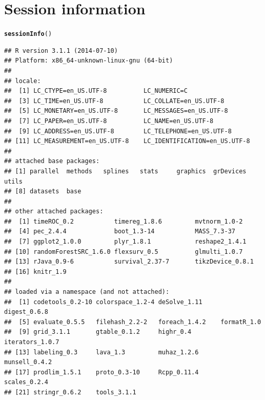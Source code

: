 \documentclass{article}\usepackage[]{graphicx}\usepackage[]{color}
\makeatletter
\newcommand{\hlstd}[1]{\textcolor[rgb]{0.345,0.345,0.345}{#1}}%
\newcommand{\hlkwd}[1]{\textcolor[rgb]{0.737,0.353,0.396}{\textbf{#1}}}%
\newenvironment{kframe}{%
 \def\at@end@of@kframe{}%
 \ifinner\ifhmode%
  \def\at@end@of@kframe{\end{minipage}}%
  \begin{minipage}{\columnwidth}%
 \fi\fi%
 \def\FrameCommand##1{\hskip\@totalleftmargin \hskip-\fboxsep
 \colorbox{shadecolor}{##1}\hskip-\fboxsep
     \hskip-\linewidth \hskip-\@totalleftmargin \hskip\columnwidth}%
 \MakeFramed {\advance\hsize-\width
   \@totalleftmargin\z@ \linewidth\hsize
   \@setminipage}}%
 {\par\unskip\endMakeFramed%
 \at@end@of@kframe}
\newenvironment{knitrout}{}{} %
\makeatother
\begin{document}
\section{Session information}
\begin{knitrout}
\color{fgcolor}\begin{kframe}
\begin{alltt}
\hlkwd{sessionInfo}\hlstd{()}
\end{alltt}
\begin{verbatim}
## R version 3.1.1 (2014-07-10)
## Platform: x86_64-unknown-linux-gnu (64-bit)
## 
## locale:
##  [1] LC_CTYPE=en_US.UTF-8          LC_NUMERIC=C                 
##  [3] LC_TIME=en_US.UTF-8           LC_COLLATE=en_US.UTF-8       
##  [5] LC_MONETARY=en_US.UTF-8       LC_MESSAGES=en_US.UTF-8      
##  [7] LC_PAPER=en_US.UTF-8          LC_NAME=en_US.UTF-8          
##  [9] LC_ADDRESS=en_US.UTF-8        LC_TELEPHONE=en_US.UTF-8     
## [11] LC_MEASUREMENT=en_US.UTF-8    LC_IDENTIFICATION=en_US.UTF-8
## 
## attached base packages:
## [1] parallel  methods   splines   stats     graphics  grDevices utils    
## [8] datasets  base     
## 
## other attached packages:
##  [1] timeROC_0.2           timereg_1.8.6         mvtnorm_1.0-2        
##  [4] pec_2.4.4             boot_1.3-14           MASS_7.3-37          
##  [7] ggplot2_1.0.0         plyr_1.8.1            reshape2_1.4.1       
## [10] randomForestSRC_1.6.0 flexsurv_0.5          glmulti_1.0.7        
## [13] rJava_0.9-6           survival_2.37-7       tikzDevice_0.8.1     
## [16] knitr_1.9            
## 
## loaded via a namespace (and not attached):
##  [1] codetools_0.2-10 colorspace_1.2-4 deSolve_1.11     digest_0.6.8    
##  [5] evaluate_0.5.5   filehash_2.2-2   foreach_1.4.2    formatR_1.0     
##  [9] grid_3.1.1       gtable_0.1.2     highr_0.4        iterators_1.0.7 
## [13] labeling_0.3     lava_1.3         muhaz_1.2.6      munsell_0.4.2   
## [17] prodlim_1.5.1    proto_0.3-10     Rcpp_0.11.4      scales_0.2.4    
## [21] stringr_0.6.2    tools_3.1.1
\end{verbatim}
\end{kframe}
\end{knitrout}
\end{document}

